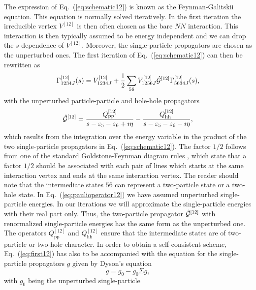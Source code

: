 The expression of Eq.\ (\ref{eq:schematic12}) is known as the Feynman-Galitskii
equation. This equation is normally solved iteratively. 
In the first iteration 
the irreducible
vertex $V^{[12]}$ is then often chosen as the bare $NN$ 
interaction. This interaction is then typically assumed to be energy
independent and we can drop the $s$ dependence of $V^{[12]}$. Moreover,
the single-particle propagators are chosen as the
unperturbed ones. The first iteration of 
Eq.\ (\ref{eq:schematic12}) can then be rewritten as
\begin{equation}
      \Gamma^{[12]}_{1234J}(s) = 
      V^{[12]}_{1234J}+\frac{1}{2}
      \sum_{56}
      V^{[12]}_{1256J}\hat{{\cal G}}^{[12]}
      \Gamma^{[12]}_{5634J}(s),
      \label{eq:first12}
\end{equation}
with the unperturbed particle-particle and hole-hole propagators 
\begin{equation}
    \hat{{\cal G}}^{[12]}=
    \frac{Q^{[12]}_{\mathrm{pp}}}{s-\varepsilon_5-\varepsilon_6+\imath \eta}-
    \frac{Q^{[12]}_{\mathrm{hh}}}{s-\varepsilon_5-\varepsilon_6-\imath \eta},
    \label{eq:paulioperator12}
\end{equation}
which results from the integration over the energy variable 
in the product of the two single-particle
propagators in Eq.\ (\ref{eq:schematic12}). 
The factor $1/2$ follows from 
one of the standard Goldstone-Feynman diagram 
rules \cite{kstop81}, which state
that a factor $1/2$ should be associated with each pair of lines 
which starts at the same interaction vertex and ends at the same
interaction vertex. 
The reader should note that the intermediate states $56$
can represent a two-particle state or a two-hole state.
In Eq.\ (\ref{eq:paulioperator12}) we have assumed unperturbed single-particle
energies. 
In our iterations we will approximate the single-particle energies
with their real part only. Thus, 
the two-particle propagator 
$\hat{{\cal G}}^{[12]}$
with renormalized single-particle energies has the same
form as the unperturbed one.
The operators $Q^{[12]}_{\mathrm{pp}}$ and $Q^{[12]}_{\mathrm{hh}}$ 
ensure that the intermediate states are of two-particle
or two-hole character. 
In order to obtain a self-consistent scheme, Eq.\ (\ref{eq:first12}) 
has also to be accompanied with the 
equation for the single-particle propagators $g$ 
given by Dyson's equation
\begin{equation}
    g=g_0-g_0\Sigma g,
    \label{eq:dyson12}
\end{equation}
with $g_0$ being the unperturbed single-particle 
